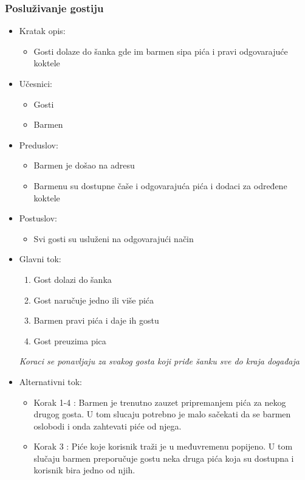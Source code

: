 \documentclass[a4paper]{article}
\begin{document}
\subsubsection{Posluživanje gostiju}

\begin{itemize}
    \item Kratak opis:
        \begin{itemize}
            \item Gosti dolaze do šanka gde im barmen sipa pića i pravi odgovarajuće koktele 
        \end{itemize}
    \item Učesnici:
        \begin{itemize}
            \item Gosti
            \item Barmen
        \end{itemize}
    \item Preduslov:
        \begin{itemize}
            \item Barmen je došao na adresu
		    \item Barmenu su dostupne čaše i odgovarajuća pića i dodaci za određene koktele	
        \end{itemize}
    \item Postuslov:
        \begin{itemize}
            \item Svi gosti su usluženi na odgovarajući način
        \end{itemize}
    \item Glavni tok:
        \begin{enumerate}
           \item Gost dolazi do šanka
		   \item Gost naručuje jedno ili više pića
		   \item Barmen pravi pića i daje ih gostu
		   \item Gost preuzima pica
		  \end{enumerate}
		\textit{Koraci se ponavljaju za svakog gosta koji priđe šanku sve do kraja događaja}
	
    \item Alternativni tok:
        \begin{itemize}
            \item Korak 1-4 : Barmen je trenutno zauzet pripremanjem pića za nekog drugog gosta. U tom slucaju potrebno je malo sačekati da se barmen oslobodi i onda zahtevati piće od njega.
	      \item	Korak 3 : Piće koje korisnik traži je u međuvremenu popijeno. U tom slučaju barmen preporučuje gostu neka druga pića koja su dostupna i korisnik bira jedno od njih.

        \end{itemize}
\end{itemize}
\end{document}
